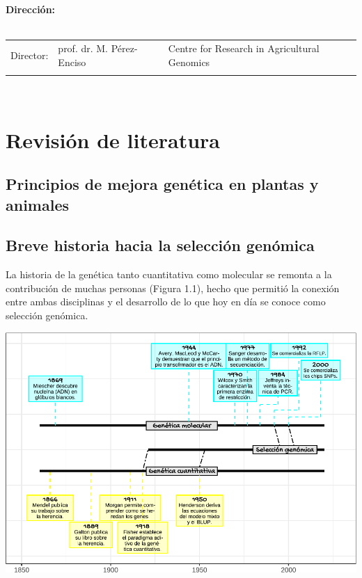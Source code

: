 \documentclass[11pt,spanish,a4paper,oneside,]{book} %
\begin{document}
\clearpage
\thispagestyle{empty}
\noindent\textbf{Dirección:}\\
\\
\noindent\begin{tabular}{@{}lll}

Director:
&  prof. dr. M. Pérez-Enciso & Centre for Research in Agricultural Genomics\\

\\
\end{tabular}\\



{
\hypersetup{linkcolor=black}
\setcounter{tocdepth}{1}
\tableofcontents
}
\mainmatter
\hypertarget{revisiuxf3n-de-literatura}{%
\chapter{Revisión de literatura}\label{revisiuxf3n-de-literatura}}

\hypertarget{principios-de-mejora-genuxe9tica-en-plantas-y-animales}{%
\section{Principios de mejora genética en plantas y animales}\label{principios-de-mejora-genuxe9tica-en-plantas-y-animales}}

\hypertarget{breve-historia-hacia-la-selecciuxf3n-genuxf3mica}{%
\section{Breve historia hacia la selección genómica}\label{breve-historia-hacia-la-selecciuxf3n-genuxf3mica}}

La historia de la genética tanto cuantitativa como molecular se remonta a la contribución de muchas personas (Figura 1.1), hecho que permitió la conexión entre ambas disciplinas y el desarrollo de lo que hoy en día se conoce como selección genómica.

\begin{center}\includegraphics[width=1\linewidth]{figures/Crono} \end{center}
\end{document}
